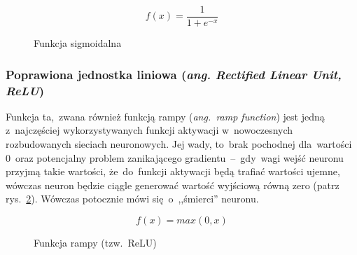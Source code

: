 \begin{minipage}[t]{\textwidth}
\begin{equation}
	f(x) = \frac{1}{1+e^{-x}}
\end{equation}

\begin{figure}[H]
    \centering
    \caption{Funkcja sigmoidalna}
    \label{rys:f.sigmoidalna}
\end{figure}
\end{minipage}

\subsubsection{Poprawiona jednostka liniowa (\textit{ang. Rectified Linear Unit, ReLU})}
Funkcja ta,~zwana również funkcją rampy (\textit{ang.~ramp function}) jest jedną z~najczęściej wykorzystywanych funkcji
aktywacji w~nowoczesnych rozbudowanych sieciach neuronowych. Jej wady, to~brak pochodnej dla~wartości 0~oraz potencjalny
problem zanikającego gradientu~--~gdy~wagi wejść neuronu przyjmą takie wartości, że~do~funkcji aktywacji będą trafiać
wartości ujemne, wówczas neuron będzie ciągle generować wartość wyjściową równą zero (patrz rys.~\ref{rys:f.rampy}).
Wówczas potocznie mówi się~o~,,śmierci'' neuronu.

\begin{minipage}[t]{\textwidth}
\begin{equation}
	f(x) = max(0,x)
\end{equation}
\begin{figure}[H]
    \centering
    \caption{Funkcja rampy (tzw.~ReLU)}
    \label{rys:f.rampy}
\end{figure}
\end{minipage}

